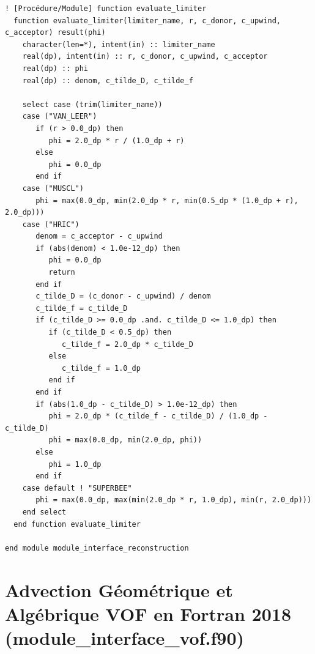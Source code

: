 \documentclass[10pt,a4paper,oneside]{book}
\begin{document}
\begin{lstlisting}[language={[95]Fortran}]
  ! [Procédure/Module] function evaluate_limiter
  function evaluate_limiter(limiter_name, r, c_donor, c_upwind, c_acceptor) result(phi)
    character(len=*), intent(in) :: limiter_name
    real(dp), intent(in) :: r, c_donor, c_upwind, c_acceptor
    real(dp) :: phi
    real(dp) :: denom, c_tilde_D, c_tilde_f

    select case (trim(limiter_name))
    case ("VAN_LEER")
       if (r > 0.0_dp) then
          phi = 2.0_dp * r / (1.0_dp + r)
       else
          phi = 0.0_dp
       end if
    case ("MUSCL")
       phi = max(0.0_dp, min(2.0_dp * r, min(0.5_dp * (1.0_dp + r), 2.0_dp)))
    case ("HRIC")
       denom = c_acceptor - c_upwind
       if (abs(denom) < 1.0e-12_dp) then
          phi = 0.0_dp
          return
       end if
       c_tilde_D = (c_donor - c_upwind) / denom
       c_tilde_f = c_tilde_D
       if (c_tilde_D >= 0.0_dp .and. c_tilde_D <= 1.0_dp) then
          if (c_tilde_D < 0.5_dp) then
             c_tilde_f = 2.0_dp * c_tilde_D
          else
             c_tilde_f = 1.0_dp
          end if
       end if
       if (abs(1.0_dp - c_tilde_D) > 1.0e-12_dp) then
          phi = 2.0_dp * (c_tilde_f - c_tilde_D) / (1.0_dp - c_tilde_D)
          phi = max(0.0_dp, min(2.0_dp, phi))
       else
          phi = 1.0_dp
       end if
    case default ! "SUPERBEE"
       phi = max(0.0_dp, max(min(2.0_dp * r, 1.0_dp), min(r, 2.0_dp)))
    end select
  end function evaluate_limiter

end module module_interface_reconstruction

\end{lstlisting}

\chapter{Advection Géométrique et Algébrique VOF en Fortran 2018 (module_interface_vof.f90)}
\end{document}
